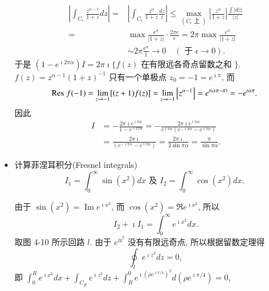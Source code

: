 \begin{itemize}
$$
\begin{aligned}
\left|\int_{C_{\epsilon}} \frac{z^{\alpha-1}}{1+z} d z\right|= & \left|\int_{C_{\epsilon}} \frac{z^\alpha}{1+z} \frac{d z}{z}\right| \leqslant \max _{\left(C_{\epsilon} \text { 上 }\right)}\left|\frac{z^\alpha}{1+z}\right| \frac{\int|d z|}{|z|} \\
= & \max \frac{\epsilon^\alpha}{|1+z|} \cdot \frac{2 \pi \epsilon}{\epsilon}=2 \pi \max \frac{\epsilon^\alpha}{|1+z|} \\
& \sim 2 \pi \frac{\epsilon^\alpha}{1} \rightarrow 0 \quad(\text { 于 } \epsilon \rightarrow 0) .
\end{aligned}
$$
于是 $\left(1-e^{\imath 2 \pi \alpha}\right) I=2 \pi \imath\{f(z)$ 在有限远各奇点留数之和 $\}$.
$f(z)=z^{\alpha-1}(1+z)^{-1}$ 只有一个单极点 $z_0=-1=e^{\imath \pi}$, 而
$$
{\mathrm{Res}\;} f(-1)=\lim _{z \rightarrow-1}[(z+1) f(z)]=\lim _{z \rightarrow-1}\left[z^{\alpha-1}\right]=e^{\imath(\alpha \pi-\pi)}=-e^{\imath \alpha \pi} \text {. }
$$
因此
$$
\begin{aligned}
I & =-\frac{2 \pi \imath e^{\imath \pi \alpha}}{1-e^{\imath 2 \pi \alpha}}=-\frac{2 \pi \imath e^{\imath \pi \alpha}}{e^{\imath \pi \alpha}\left(e^{-\imath \pi \alpha}-e^{\imath \pi \alpha}\right)} \\
& =\frac{2 \pi \imath}{\left(e^{-\imath \pi \alpha}-e^{\imath \pi \alpha}\right)}=\frac{2 \pi \imath}{2 \sin \pi \alpha}=\frac{\pi}{\sin \pi \alpha} .
\end{aligned}
$$

    \item 计算菲涅耳积分(Fresnel integrals)
    $$
    I_1=\int_0^{\infty} \sin \left(x^2\right) d x \text { 及 } I_2=\int_0^{\infty} \cos \left(x^2\right) d x \text {. }
    $$

    由于 $\sin \left(x^2\right)=\operatorname{Im} e^{\imath x^2}$, 而 $\cos \left(x^2\right)=\Re e^{\imath x^2}$, 所以
$$
I_2+\imath I_1=\int_0^{\infty} e^{\imath x^2} d x .
$$
取图 4-10 所示回路 $l$. 由于 $e^{\mathrm{iz}^2}$ 没有有限远奇点, 所以根据留数定理得
$$
\oint_l e^{\imath z^2} d z=0,
$$
即 $\int_0^R e^{\imath x^2} d x+\int_{C_R} e^{\imath z^2} d z+\int_R^0 e^{\imath\left(\rho e^{\imath \pi / 4}\right)^2} d\left(\rho e^{\imath \pi / 4}\right)=0$,


\end{itemize}
